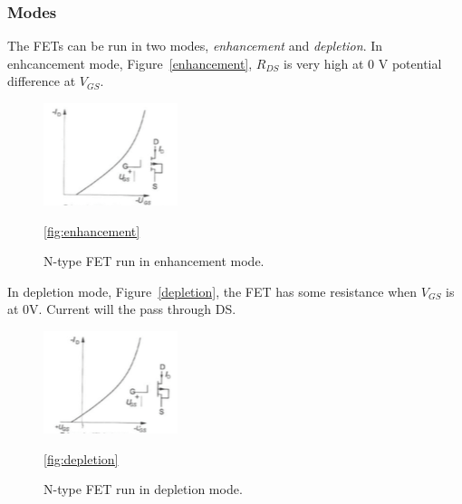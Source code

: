 \subsubsection*{Modes}
The FETs can be run in two modes, \textit{enhancement} and \textit{depletion}.
In enhcancement mode, Figure~\ref{enhancement}, $R_{DS}$ is very high at 0 V 
potential difference at $V_{GS}$. 
\begin{figure}[H]
    \centering
    \includegraphics{./lec3/enhancement.png}
    \caption{N-type FET run in enhancement mode.}
    \ref{fig:enhancement}
\end{figure}
In depletion mode, Figure~\ref{depletion}, the FET has some resistance when $V_{GS}$ 
is at 0V. Current will the pass through DS.
\begin{figure}[H]
    \centering
    \includegraphics{./lec3/depletion.png}
    \caption{N-type FET run in depletion mode.}
    \ref{fig:depletion}
\end{figure}
